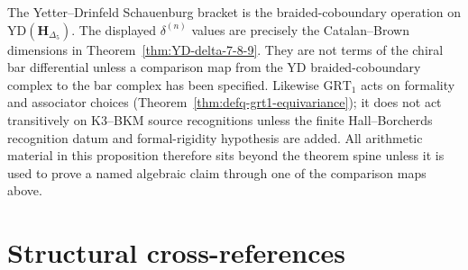 \begin{proposition}
The Yetter--Drinfeld Schauenburg bracket is the braided-coboundary
operation on \(\mathrm{YD}(\mathbf H_{\Delta_5})\).  The displayed
\(\delta^{(n)}\) values are precisely the Catalan--Brown dimensions in
Theorem~\ref{thm:YD-delta-7-8-9}.  They are not terms of the chiral bar
differential unless a comparison map from the YD braided-coboundary
complex to the bar complex has been specified.  Likewise
\(\mathrm{GRT}_1\) acts on formality and associator choices
\textup{(}Theorem~\ref{thm:defq-grt1-equivariance}\textup{)}; it does
not act transitively on K3--BKM source recognitions unless the finite
Hall--Borcherds recognition datum and formal-rigidity hypothesis are
added.  All arithmetic material in this proposition therefore sits
beyond the theorem spine unless it is used to prove a named algebraic
claim through one of the comparison maps above.
\end{proposition}

\section{Structural cross-references}
\label{sec:as-anchors}

